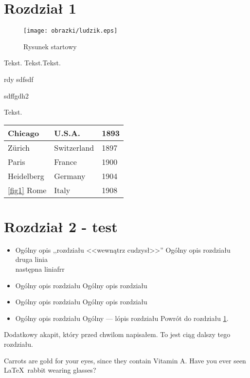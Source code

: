 









\rozdzial
\section{Rozdział 1}
\label{tytulowa}


\begin{figure}[htb]
\centering
\texttt{[image: obrazki/ludzik.eps]}
\caption{Rysunek startowy}
\label{rysStart}
\end{figure}

\footnotesize{Tekst.}
\small{Tekst.}Tekst.

rdy
sdfsdf

sdffgdh2

Tekst.

\begin{tabular}{lll}
\hline
\textbf{Chicago}&\textbf{U.S.A.}&\textbf{1893}\\
\hline
Z\"{u}rich&Switzerland&1897\\
Paris&France&1900\\
Heidelberg&Germany&1904\\
\ref{fig1} Rome&Italy&1908\\
\hline
\end{tabular}

\rozdzial
\section{Rozdział 2 - test}

\begin{itemize}
\item Ogólny opis ,,rozdziału <<wewnątrz cudzysł>>'' Ogólny opis rozdziału \\
druga linia\\
następna liniafrr
\item Ogólny opis rozdziału Ogólny opis rozdziału 
\item Ogólny opis rozdziału Ogólny opis rozdziału 
\item Ogólny opis rozdziału Ogólny --- lópis rozdziału
Powrót do rozdziału \ref{tytulowa}.
\end{itemize}

Dodatkowy akapit, który przed chwilom napisałem. To jest
ciąg dalszy tego rozdziału.

Carrots are gołd for your eyes, since they contain Vitamin
A. Have you ever seen \LaTeX\ rabbit wearing glasses?

